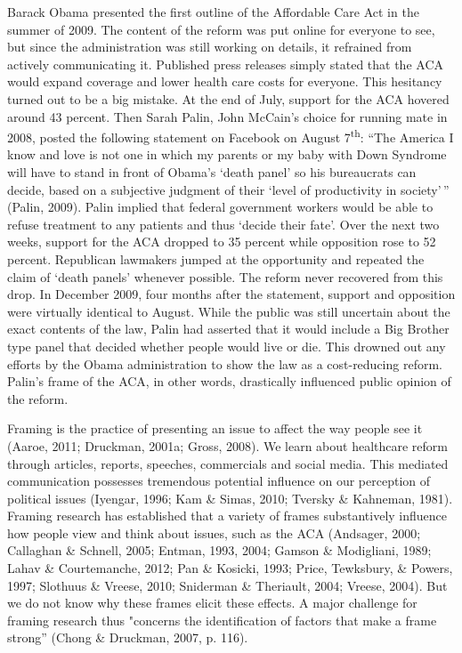 \documentclass[12pt,econ]{sources/authesis}
\begin{document}
Barack Obama presented the first outline of the Affordable Care Act in the summer of 2009. The content of the reform was put online for everyone to see, but since the administration was still working on details, it refrained from actively communicating it. Published press releases simply stated that the ACA would expand coverage and lower health care costs for everyone. This hesitancy turned out to be a big mistake. At the end of July, support for the ACA hovered around 43 percent. Then Sarah Palin, John McCain's choice for running mate in 2008, posted the following statement on Facebook on August 7\textsuperscript{th}: ``The America I know and love is not one in which my parents or my baby with Down Syndrome will have to stand in front of Obama's `death panel' so his bureaucrats can decide, based on a subjective judgment of their `level of productivity in society'\,'' (Palin, 2009). Palin implied that federal government workers would be able to refuse treatment to any patients and thus `decide their fate'. Over the next two weeks, support for the ACA dropped to 35 percent while opposition rose to 52 percent. Republican lawmakers jumped at the opportunity and repeated the claim of `death panels' whenever possible. The reform never recovered from this drop. In December 2009, four months after the statement, support and opposition were virtually identical to August. While the public was still uncertain about the exact contents of the law, Palin had asserted that it would include a Big Brother type panel that decided whether people would live or die. This drowned out any efforts by the Obama administration to show the law as a cost-reducing reform. Palin's frame of the ACA, in other words, drastically influenced public opinion of the reform.

Framing is the practice of presenting an issue to affect the way people see it (Aaroe, 2011; Druckman, 2001a; Gross, 2008). We learn about healthcare reform through articles, reports, speeches, commercials and social media. This mediated communication possesses tremendous potential influence on our perception of political issues (Iyengar, 1996; Kam \& Simas, 2010; Tversky \& Kahneman, 1981). Framing research has established that a variety of frames substantively influence how people view and think about issues, such as the ACA (Andsager, 2000; Callaghan \& Schnell, 2005; Entman, 1993, 2004; Gamson \& Modigliani, 1989; Lahav \& Courtemanche, 2012; Pan \& Kosicki, 1993; Price, Tewksbury, \& Powers, 1997; Slothuus \& Vreese, 2010; Sniderman \& Theriault, 2004; Vreese, 2004). But we do not know why these frames elicit these effects. A major challenge for framing research thus "concerns the identification of factors that make a frame strong'' (Chong \& Druckman, 2007, p. 116).
\end{document}
